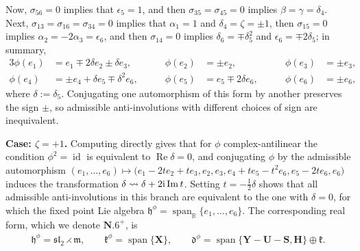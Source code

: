 \documentclass[10pt,a4paper]{amsart}
\DeclareMathOperator{\id} {id}
\DeclareMathOperator{\spanOperator}{span}
\renewcommand{\Im}{\operatorname{Im}}
\renewcommand{\Re}{\operatorname{Re}}
\newcommand{\Span}[1]{\spanOperator\{{#1}\}}
\newcommand{\bbR}{\mathbb{R}}
\newcommand{\mbH}{\mathbf{H}}
\newcommand{\mbS}{\mathbf{S}}
\newcommand{\mbU}{\mathbf{U}}
\newcommand{\mbX}{\mathbf{X}}
\newcommand{\mbY}{\mathbf{Y}}
\newcommand{\mfd} {\mathfrak{d}}
\newcommand{\mfh} {\mathfrak{h}}
\newcommand{\mfk} {\mathfrak{k}}
\newcommand{\mfm} {\mathfrak{m}}
\newcommand{\mfsl} {\mathfrak{sl}}
\numberwithin{equation}{section}
\begin{document}
Now, $\sigma_{56} = 0$ implies that $\epsilon_5 = 1$, and then $\sigma_{35} = \sigma_{45} = 0$ implies $\beta = \gamma = \delta_4$. Next, $\sigma_{13} = \sigma_{16} = \sigma_{34} = 0$ implies that $\alpha_1 = 1$ and $\delta_4 = \zeta = \pm 1$, then $\sigma_{15} = 0$ implies $\alpha_2 = -2 \alpha_3 = \epsilon_6$, and then $\sigma_{14} = 0$ implies $\delta_6 = \mp \delta_5^2$ and $\epsilon_6 = \mp 2 \delta_5$; in summary,
\begin{alignat*}{3}
	 \phi(e_1) &= e_1 \mp 2 \delta e_2 \pm \delta e_3, \qquad
	&\phi(e_2) &= \pm e_2, \qquad
	&\phi(e_3) &= \pm e_3, \\
	 \phi(e_4) &= \pm e_4 + \delta e_5 \mp \delta^2 e_6, \qquad
	&\phi(e_5) &= e_5 \mp 2 \delta e_6, \qquad
	&\phi(e_6) &= \pm e_6 ,
\end{alignat*}
where $\delta := \delta_5$. Conjugating one automorphism of this form by another preserves the sign $\pm$, so admissible anti-involutions with different choices of sign are inequivalent.

\smallskip
\noindent \textbf{Case: $\zeta = + 1$.} Computing directly gives that for $\phi$ complex-antilinear the condition $\phi^2 = \id$ is equivalent to $\Re \delta = 0$, and conjugating $\phi$ by the admissible automorphism $(e_1, \ldots, e_6) \mapsto \big(e_1 - 2 t e_2 + t e_3, e_2, e_3, e_4 + t e_5 - t^2 e_6, e_5 - 2 t e_6, e_6\big)$ induces the transformation $\delta \rightsquigarrow \delta + 2 {\rm i} \Im t$. Setting $t = -\frac{1}{2} \delta$ shows that all admissible anti-involutions in this branch are equivalent to the one with $\delta = 0$, for which the fixed point Lie algebra $\mfh^{\phi} = \spanOperator_{\bbR}\{e_1, \ldots, e_6\}$. The corresponding real form, which we denote $\mathbf{N.6}^+$, is
\begin{gather*}
	\boxed{
		\mfh^{\phi} = \mfsl_2 \rightthreetimes \mfm , \qquad
		\mfk^{\phi} = \Span{\mbX}, \qquad
		\mfd^{\phi} = \Span{\mbY - \mbU - \mbS, \mbH} \oplus \mfk .
	}
\end{gather*}
\end{document}
